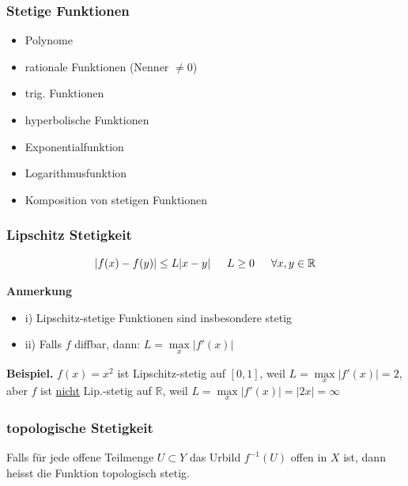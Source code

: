 \documentclass[8pt, a4paper, landscape, fleqn]{scrartcl}
\newenvironment {example}
				{\begin{itshape} \begin{small}}
				{\end{small} \end{itshape}}
\newenvironment {annotation}[1]
				{\begin{itshape} \begin{small} \textbf{#1} \begin{itemize}}
				{\end{itemize} \end{small} \end{itshape}}
\newenvironment {eq}
				{\begin{equation*}}
				{\end{equation*}}
\def\R{\mathbb{R}}
\begin{document}
\begin{multicols*}{3}
				\subsubsection{Stetige Funktionen}
					\setlength{\columnseprule}{0pt}
					\begin{multicols}{2}
						\begin{itemize}
							\item Polynome
							\item rationale Funktionen (Nenner $\ne 0$)
							\item trig. Funktionen
							\item hyperbolische Funktionen
							\item Exponentialfunktion
							\item Logarithmusfunktion
							\item Komposition von stetigen Funktionen
						\end{itemize}
					\end{multicols}
					\setlength{\columnseprule}{0.5pt}
				\subsubsection{Lipschitz Stetigkeit}
					\begin{eq}
						\left \vert f(x)-f(y) \right \vert \le  L \vert x-y \vert \hspace{15pt} L\ge 0 \hspace{15pt} \forall x, y \in \mathbb{R}\\
					\end{eq}
					\begin{annotation}{Anmerkung}
						\item[i)] Lipschitz-stetige Funktionen sind insbesondere stetig
						\item[ii)] Falls $f$ diffbar, dann: $L = \underset{x}{\max} |f'(x)|$
					\end{annotation}
					\begin{example}
		                \textbf{Beispiel. } $f(x) = x^2$ ist Lipschitz-stetig auf $[0,1]$, weil $L = \underset{x}{\max} |f'(x)| = 2$, aber $f$ ist \underline{nicht} Lip.-stetig auf $\R$, weil $L = \underset{x}{\max} |f'(x)| = |2x| = \infty$
					\end{example} 
			    \subsubsection{topologische Stetigkeit}
			        Falls für jede offene Teilmenge $U \subset Y$ das Urbild $f^{-1}(U)$ offen in $X$ ist, dann heisst die Funktion topologisch stetig.

\end{multicols*}
\end{document}
